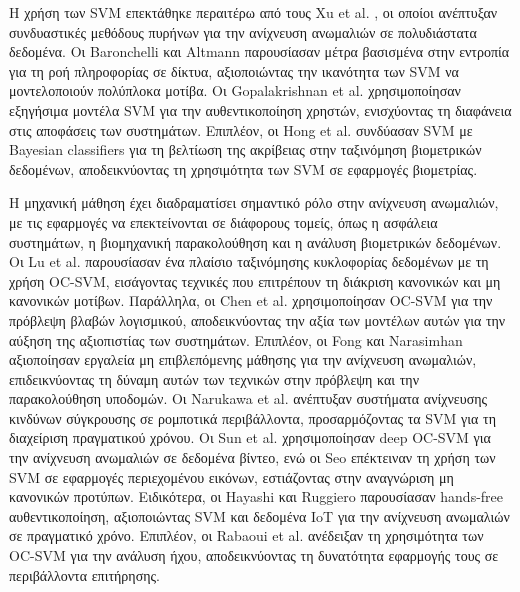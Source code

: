 Η χρήση των SVM επεκτάθηκε περαιτέρω από τους Xu et al. \cite{xu2013novel}, οι οποίοι ανέπτυξαν συνδυαστικές μεθόδους πυρήνων για την ανίχνευση ανωμαλιών σε πολυδιάστατα δεδομένα. Οι Baronchelli και Altmann \cite{baronchelli2020entropy} παρουσίασαν μέτρα βασισμένα στην εντροπία για τη ροή πληροφορίας σε δίκτυα, αξιοποιώντας την ικανότητα των SVM να μοντελοποιούν πολύπλοκα μοτίβα. Οι Gopalakrishnan et al. \cite{gopalakrishnan2021explainable} χρησιμοποίησαν εξηγήσιμα μοντέλα SVM για την αυθεντικοποίηση χρηστών, ενισχύοντας τη διαφάνεια στις αποφάσεις των συστημάτων. Επιπλέον, οι Hong et al. \cite{hong2008fingerprint} συνδύασαν SVM με Bayesian classifiers για τη βελτίωση της ακρίβειας στην ταξινόμηση βιομετρικών δεδομένων, αποδεικνύοντας τη χρησιμότητα των SVM σε εφαρμογές βιομετρίας.

Η μηχανική μάθηση έχει διαδραματίσει σημαντικό ρόλο στην ανίχνευση ανωμαλιών, με τις εφαρμογές να επεκτείνονται σε διάφορους τομείς, όπως η ασφάλεια συστημάτων, η βιομηχανική παρακολούθηση και η ανάλυση βιομετρικών δεδομένων. Οι Lu et al. \cite{lu2010tcfom} παρουσίασαν ένα πλαίσιο ταξινόμησης κυκλοφορίας δεδομένων με τη χρήση OC-SVM, εισάγοντας τεχνικές που επιτρέπουν τη διάκριση κανονικών και μη κανονικών μοτίβων. Παράλληλα, οι Chen et al. \cite{chen2016software} χρησιμοποίησαν OC-SVM για την πρόβλεψη βλαβών λογισμικού, αποδεικνύοντας την αξία των μοντέλων αυτών για την αύξηση της αξιοπιστίας των συστημάτων. Επιπλέον, οι Fong και Narasimhan \cite{fong2021unsupervised} αξιοποίησαν εργαλεία μη επιβλεπόμενης μάθησης για την ανίχνευση ανωμαλιών, επιδεικνύοντας τη δύναμη αυτών των τεχνικών στην πρόβλεψη και την παρακολούθηση υποδομών. Οι Narukawa et al. \cite{narukawa2017realtime} ανέπτυξαν συστήματα ανίχνευσης κινδύνων σύγκρουσης σε ρομποτικά περιβάλλοντα, προσαρμόζοντας τα SVM για τη διαχείριση πραγματικού χρόνου. Οι Sun et al. \cite{sun2017abnormal} χρησιμοποίησαν deep OC-SVM για την ανίχνευση ανωμαλιών σε δεδομένα βίντεο, ενώ οι Seo \cite{seo2007application} επέκτειναν τη χρήση των SVM σε εφαρμογές περιεχομένου εικόνων, εστιάζοντας στην αναγνώριση μη κανονικών προτύπων. Ειδικότερα, οι Hayashi και Ruggiero \cite{hayashi2023handsfree} παρουσίασαν hands-free αυθεντικοποίηση, αξιοποιώντας SVM και δεδομένα IoT για την ανίχνευση ανωμαλιών σε πραγματικό χρόνο. Επιπλέον, οι Rabaoui et al. \cite{rabaoui2008using} ανέδειξαν τη χρησιμότητα των OC-SVM για την ανάλυση ήχου, αποδεικνύοντας τη δυνατότητα εφαρμογής τους σε περιβάλλοντα επιτήρησης.

